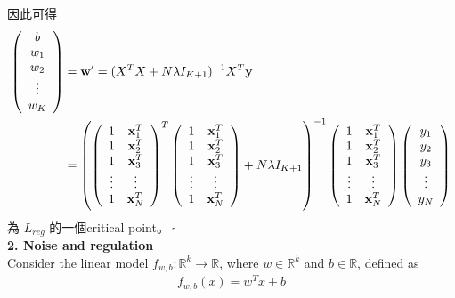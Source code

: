 \documentclass{article}
\begin{document}
因此可得
\begin{align*}
    \left(
    \begin{array}{c}
        b\\
        w_1\\
        w_2\\
        \vdots\\
        w_K
    \end{array}
    \right)
    &= {\bf w}^\prime = (X^T X + N \lambda I_{K + 1})^{-1} X^T {\bf y}\\
    &= \left(
    \left(
    \begin{array}{cc}
        1 & {\bf x}_1^T\\
        1 & {\bf x}_2^T\\
        1 & {\bf x}_3^T\\
        \vdots & \vdots\\
        1 & {\bf x}_N^T
    \end{array}
    \right)^T
    \left(
    \begin{array}{cc}
        1 & {\bf x}_1^T\\
        1 & {\bf x}_2^T\\
        1 & {\bf x}_3^T\\
        \vdots & \vdots\\
        1 & {\bf x}_N^T
    \end{array}
    \right)
    + N \lambda I_{K + 1}
    \right)^{-1}
    \left(
    \begin{array}{cc}
        1 & {\bf x}_1^T\\
        1 & {\bf x}_2^T\\
        1 & {\bf x}_3^T\\
        \vdots & \vdots\\
        1 & {\bf x}_N^T
    \end{array}
    \right)
    \left(
    \begin{array}{c}
        y_1\\
        y_2\\
        y_3\\
        \vdots\\
        y_N
    \end{array}
    \right)
\end{align*}
為 $L_{reg}$ 的一個critical point。$\ \square$\\

\noindent
{\bf \Large 2. Noise and regulation}\\

Consider the linear model $f_{w, b}: {\mathbb R}^k \rightarrow {\mathbb R}$, where $w \in {\mathbb R}^k$ and $b \in {\mathbb R}$, defined as
\begin{align*}
    f_{w, b}(x) = w^T x + b
\end{align*}
\end{document}
